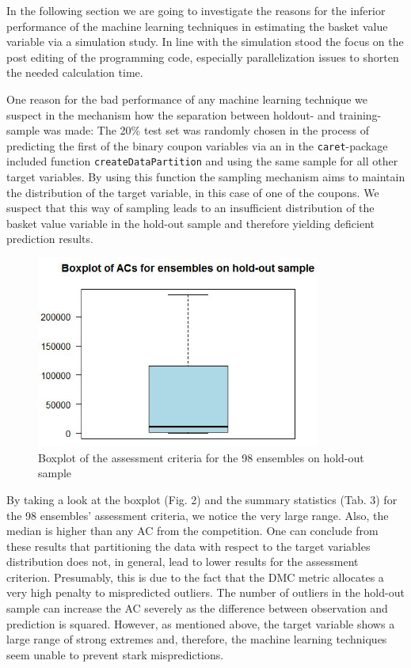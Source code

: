 In the following section we are going to investigate the reasons for the inferior performance of the machine learning techniques in estimating the basket value variable via a simulation study. In line with the simulation stood the focus on the post editing of the programming code, especially parallelization issues to shorten the needed calculation time.

One reason for the bad performance of any machine learning technique we suspect in the mechanism how the separation between holdout- and training-sample was made: The 20\% test set was randomly chosen in the process of predicting the first of the binary coupon variables via an in the \texttt{caret}-package included function \texttt{createDataPartition} and using the same sample for all other target variables. By using this function the sampling mechanism aims to maintain the distribution of the target variable, in this case of one of the coupons. We suspect that this way of sampling leads to an insufficient distribution of the basket value variable in the hold-out sample and therefore yielding deficient prediction results.

\begin{figure}[H]
\centering
\includegraphics[width=0.83\textwidth]{boxplotACES.jpg}
\caption{Boxplot of the assessment criteria for the 98 ensembles on hold-out sample}
\end{figure}

By taking a look at the boxplot (Fig. 2) and the summary statistics (Tab. 3) for the 98 ensembles' assessment criteria, we notice the very large range. Also, the median is higher than any AC from the competition. One can conclude from these results that partitioning the data with respect to the target variables distribution does not, in general, lead to lower results for the assessment criterion. Presumably, this is due to the fact that the DMC metric allocates a very high penalty to mispredicted outliers. The number of outliers in the hold-out sample can increase the AC severely as the difference between observation and prediction is squared. However, as mentioned above, the target variable shows a large range of strong extremes and, therefore, the machine learning techniques seem unable to prevent stark mispredictions.

